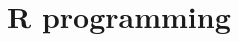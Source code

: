 \documentclass[aspectratio=1610,10pt,xcolor=x11names]{beamer}
\begin{document}




\part{R programming}
\frame{\partpage}




% 
% 
% 

% 


\end{document}
